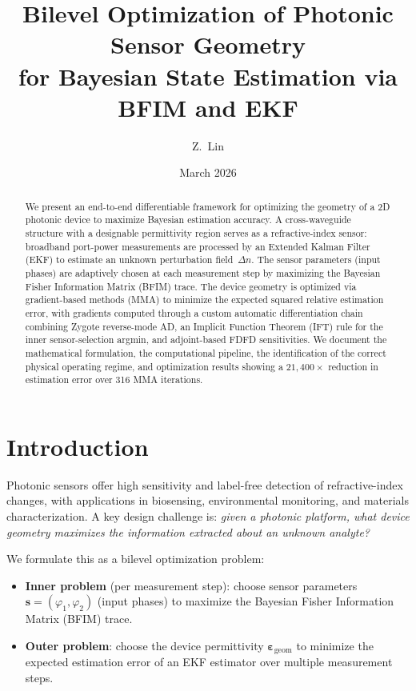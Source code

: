 \documentclass[11pt,a4paper]{article}
\title{Bilevel Optimization of Photonic Sensor Geometry\\for Bayesian State Estimation via BFIM and EKF}
\author{Z.\ Lin}
\date{March 2026}
\begin{document}
\maketitle

\begin{abstract}
We present an end-to-end differentiable framework for optimizing the geometry of a 2D photonic device to maximize Bayesian estimation accuracy.  A cross-waveguide structure with a designable permittivity region serves as a refractive-index sensor: broadband port-power measurements are processed by an Extended Kalman Filter (EKF) to estimate an unknown perturbation field~$\Delta n$.  The sensor parameters (input phases) are adaptively chosen at each measurement step by maximizing the Bayesian Fisher Information Matrix (BFIM) trace.  The device geometry is optimized via gradient-based methods (MMA) to minimize the expected squared relative estimation error, with gradients computed through a custom automatic differentiation chain combining Zygote reverse-mode AD, an Implicit Function Theorem (IFT) rule for the inner sensor-selection argmin, and adjoint-based FDFD sensitivities.  We document the mathematical formulation, the computational pipeline, the identification of the correct physical operating regime, and optimization results showing a $21{,}400\times$ reduction in estimation error over 316 MMA iterations.
\end{abstract}

\tableofcontents
\newpage

\section{Introduction}

Photonic sensors offer high sensitivity and label-free detection of refractive-index changes, with applications in biosensing, environmental monitoring, and materials characterization.  A key design challenge is: \emph{given a photonic platform, what device geometry maximizes the information extracted about an unknown analyte?}

We formulate this as a bilevel optimization problem:
\begin{itemize}[nosep]
  \item \textbf{Inner problem} (per measurement step): choose sensor parameters $\bm{s} = (\varphi_1, \varphi_2)$ (input phases) to maximize the Bayesian Fisher Information Matrix (BFIM) trace.
  \item \textbf{Outer problem}: choose the device permittivity $\bm{\varepsilon}_{\text{geom}}$ to minimize the expected estimation error of an EKF estimator over multiple measurement steps.
\end{itemize}
\end{document}
